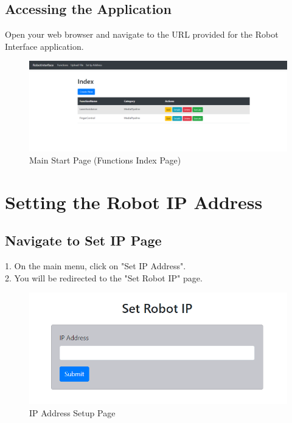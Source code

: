 \documentclass[12pt,a4paper]{scrbook}
\begin{document}
	\subsection{Accessing the Application}
	Open your web browser and navigate to the URL provided for the Robot Interface application.
	\begin{figure}[H]
		\centering
		\includegraphics[width=\linewidth]{Images/mainmenu.png}
		\caption{Main Start Page (Functions Index Page)}
		\label{}
	\end{figure}
	\section{Setting the Robot IP Address}
	
	\subsection{Navigate to Set IP Page}
	1. On the main menu, click on "Set IP Address".\\
	2. You will be redirected to the "Set Robot IP" page.\\
	\begin{figure}[H]
		\centering
		\includegraphics[width=\linewidth]{Images/ipsetter.png}
		\caption{IP Address Setup Page}
		\label{}
	\end{figure}
	
\end{document}
